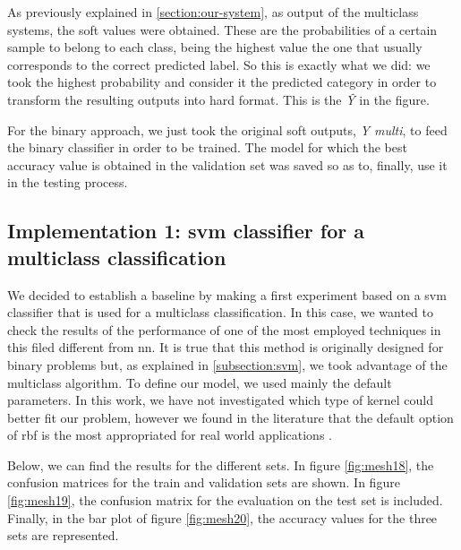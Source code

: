 	As previously explained in \ref{section:our-system}, as output of the multiclass systems, the soft values were obtained. These are the probabilities of a certain sample to belong to each class, being the highest value the one that usually corresponds to the correct predicted label. So this is exactly what we did: we took the highest probability and consider it the predicted category in order to transform the resulting outputs into hard format. This is the \textit{\^{Y}} in the figure. 
	
	For the binary approach, we just took the original soft outputs, \textit{Y multi}, to feed the binary classifier in order to be trained. The model for which the best accuracy value is obtained in the validation set was saved so as to, finally, use it in the testing process.
	
\subsection{Implementation 1: \acrshort{svm} classifier for a multiclass classification}
\label{subsection:implementation-1}

	We decided to establish a baseline by making a first experiment based on a \acrshort{svm} classifier that is used for a multiclass classification. In this case, we wanted to check the results of the performance of one of the most employed techniques in this filed different from \acrshort{nn}. It is true that this method is originally designed for binary problems but, as explained in \ref{subsection:svm}, we took advantage of the multiclass algorithm. To define our model, we used mainly the default parameters. In this work, we have not investigated which type of kernel could better fit our problem, however we found in the literature that the default option of \acrshort{rbf} is the most appropriated for real world applications \cite{Prajapati2010}. 
	
	Below, we can find the results for the different sets. In figure \ref{fig:mesh18}, the confusion matrices for the train and validation sets are shown. In figure \ref{fig:mesh19}, the confusion matrix for the evaluation on the test set is included. Finally, in the bar plot of figure \ref{fig:mesh20}, the accuracy values for the three sets are represented.
	
